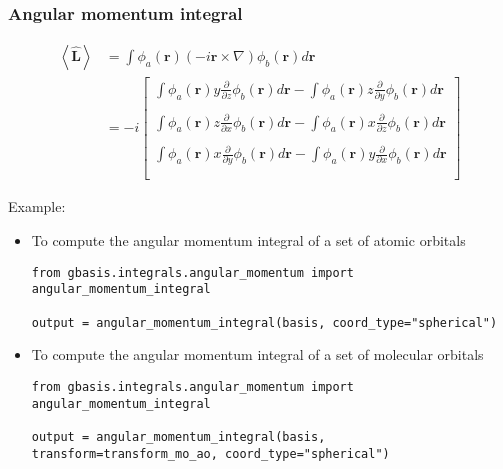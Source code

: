 \documentclass[letterpaper]{article}
\begin{document}
\subsubsection{Angular momentum integral}
\begin{equation}
  \label{eq:angular_momentum}
  \begin{split}
    \left< \hat{\mathbf{L}} \right>
    &= \int \phi_a(\mathbf{r}) \left( -i \mathbf{r} \times \nabla \right) \phi_b(\mathbf{r}) d\mathbf{r}\\
    &= -i
    \begin{bmatrix}
      \int \phi_a(\mathbf{r}) y\frac{\partial}{\partial z} \phi_b(\mathbf{r}) d\mathbf{r}
      - \int \phi_a(\mathbf{r}) z\frac{\partial}{\partial y} \phi_b(\mathbf{r}) d\mathbf{r}\\\\
      \int \phi_a(\mathbf{r}) z\frac{\partial}{\partial x} \phi_b(\mathbf{r}) d\mathbf{r}
      - \int \phi_a(\mathbf{r}) x\frac{\partial}{\partial z} \phi_b(\mathbf{r}) d\mathbf{r}\\\\
      \int \phi_a(\mathbf{r}) x\frac{\partial}{\partial y} \phi_b(\mathbf{r}) d\mathbf{r}
      - \int \phi_a(\mathbf{r}) y\frac{\partial}{\partial x} \phi_b(\mathbf{r}) d\mathbf{r}\\\\
    \end{bmatrix}
  \end{split}
\end{equation}

Example:
\begin{itemize}
\item To compute the angular momentum integral of a set of atomic orbitals
  \begin{lstlisting}[xleftmargin=-25pt]
from gbasis.integrals.angular_momentum import angular_momentum_integral

output = angular_momentum_integral(basis, coord_type="spherical")
\end{lstlisting}
\item To compute the angular momentum integral of a set of molecular orbitals
  \begin{lstlisting}[xleftmargin=-25pt]
from gbasis.integrals.angular_momentum import angular_momentum_integral

output = angular_momentum_integral(basis, transform=transform_mo_ao, coord_type="spherical")
\end{lstlisting}
\end{itemize}
\end{document}
